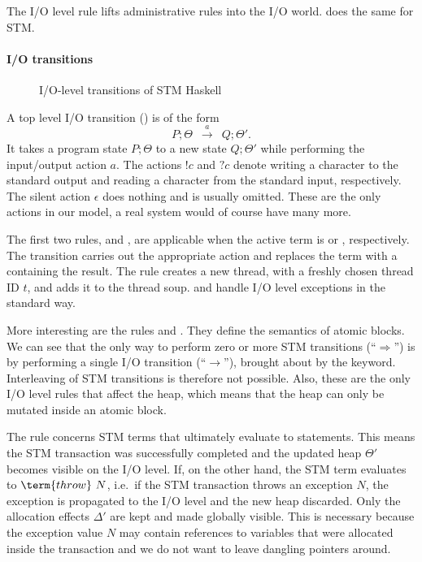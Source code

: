 The I/O level rule  lifts administrative rules into the I/O world.  does the same for STM.

\paragraph{I/O transitions}

\begin{figure}

\caption{I/O-level transitions of STM Haskell \parencite{harris-et-al-2005}}
\label{fig:orig-io}
\end{figure}

A top level I/O transition () is of the form
$$P;\Theta \enspace\xrightarrow{a}\enspace Q;\Theta'.$$ 
It takes a program state $P;\Theta$ to a new state $Q;\Theta'$ while performing the input/output action $a$.
The actions $!c$ and $?c$ denote writing a character to the standard output and reading a character from the standard input, respectively.
The silent action $\epsilon$ does nothing and is usually omitted.
These are the only actions in our model, a real system would of course have many more.

The first two rules,  and , are applicable when the active term is  or , respectively.
The transition carries out the appropriate action and replaces the term with a  containing the result.
The rule  creates a new thread, with a freshly chosen thread ID $t$, and adds it to the thread soup.
 and  handle I/O level exceptions in the standard way.

More interesting are the rules  and .
They define the semantics of atomic blocks.
We can see that the only way to perform zero or more STM transitions (``$\Rightarrow$'') is by performing a single I/O transition (``$\rightarrow$''), brought about by the  keyword.
Interleaving of STM transitions is therefore not possible.
Also, these are the only I/O level rules that affect the heap, which means that the heap can only be mutated inside an atomic block.

The rule  concerns STM terms that ultimately evaluate to  statements.
This means the STM transaction was successfully completed and the updated heap $\Theta'$ becomes visible on the I/O level.
%
If, on the other hand, the STM term evaluates to $\term{throw}\ N$, i.e.\ if the STM transaction throws an exception $N$, the exception is propagated to the I/O level and the new heap discarded.
Only the allocation effects $\Delta'$ are kept and made globally visible.
This is necessary because the exception value $N$ may contain references to variables that were allocated inside the transaction and we do not want to leave dangling pointers around.

